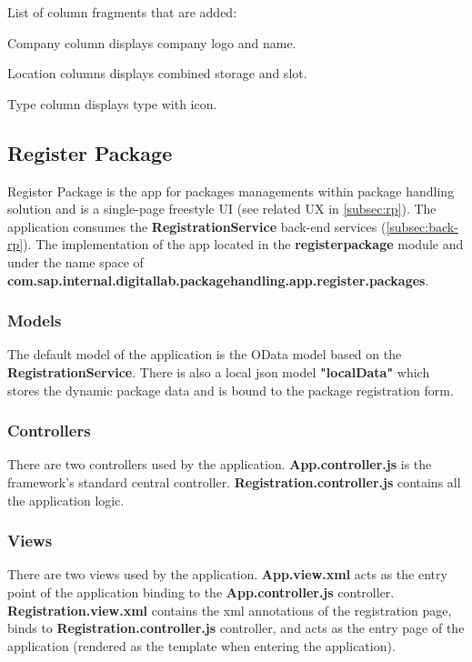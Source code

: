 \bigskip
\noindent
List of column fragments that are added:
\begin{compactenum}
    \item Company column displays company logo and name.
    \item Location columns displays combined storage and slot.
    \item Type column displays type with icon.
\end{compactenum}


\subsection{Register Package}
\label{subsec:dev-ui-rp}

Register Package is the app for packages managements within package handling solution and is a single-page freestyle UI (see related UX in \autoref{subsec:rp}).
The application consumes the \textbf{RegistrationService} back-end services (\autoref{subsec:back-rp}).
The implementation of the app
located in the \textbf{registerpackage} module and under the name space of
\textbf{com.sap.internal.digitallab.packagehandling.app.register.packages}.

\subsubsection{Models}
The default model of the application is the OData model based on the \textbf{RegistrationService}. There is also a local json model \textbf{"localData"} which stores the dynamic package data and is bound to the package registration form.

\subsubsection{Controllers}
There are two controllers used by the application. \textbf{App.controller.js} is the framework's standard central controller. \textbf{Registration.controller.js} contains all the application logic.

\subsubsection{Views}
There are two views used by the application. \textbf{App.view.xml} acts as the entry point of the application binding to the \textbf{App.controller.js} controller. \textbf{Registration.view.xml} contains the xml annotations of the registration page, binds to \textbf{Registration.controller.js} controller, and acts as the entry page of the application (rendered as the template when entering the application).

